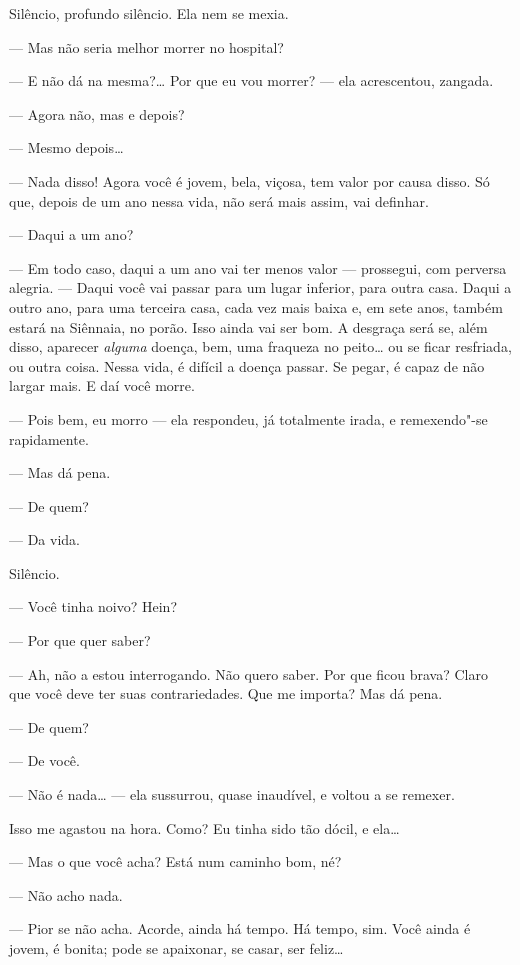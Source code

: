 Silêncio, profundo silêncio. Ela nem se mexia.

--- Mas não seria melhor morrer no hospital?

--- E não dá na mesma?\ldots{} Por que eu vou morrer? --- ela acrescentou,
zangada.

--- Agora não, mas e depois?

--- Mesmo depois\ldots{}

--- Nada disso! Agora você é jovem, bela, viçosa, tem valor por causa
disso. Só que, depois de um ano nessa vida, não será mais assim, vai
definhar.

--- Daqui a um ano?

--- Em todo caso, daqui a um ano vai ter menos valor --- prossegui, com
perversa alegria. --- Daqui você vai passar para um lugar inferior, para
outra casa. Daqui a outro ano, para uma terceira casa, cada vez mais
baixa e, em sete anos, também estará na Siênnaia, no porão. Isso ainda
vai ser bom. A desgraça será se, além disso, aparecer \emph{alguma}
doença, bem, uma fraqueza no peito\ldots{} ou se ficar resfriada, ou outra
coisa. Nessa vida, é difícil a doença passar. Se pegar, é capaz de não
largar mais. E daí você morre.

--- Pois bem, eu morro --- ela respondeu, já totalmente irada, e
remexendo"-se rapidamente.

--- Mas dá pena.

--- De quem?

--- Da vida.

Silêncio.

--- Você tinha noivo? Hein?

--- Por que quer saber?

--- Ah, não a estou interrogando. Não quero saber. Por que ficou brava?
Claro que você deve ter suas contrariedades. Que me importa? Mas dá
pena.

--- De quem?

--- De você.

--- Não é nada\ldots{} --- ela sussurrou, quase inaudível, e voltou a se remexer.

Isso me agastou na hora. Como? Eu tinha sido tão dócil, e ela\ldots{}

--- Mas o que você acha? Está num caminho bom, né?

--- Não acho nada.

--- Pior se não acha. Acorde, ainda há tempo. Há tempo, sim. Você ainda é
jovem, é bonita; pode se apaixonar, se casar, ser feliz\ldots{}

